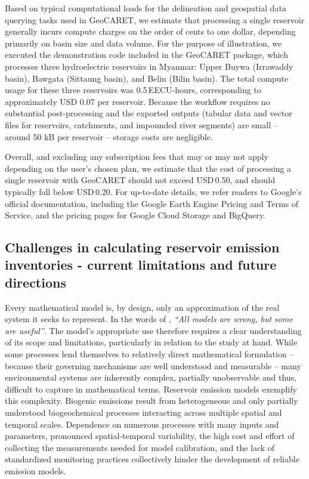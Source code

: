 \documentclass[10pt]{article}
\begin{document}
Based on typical computational loads for the delineation and geospatial data querying tasks used in GeoCARET, we estimate that processing a single reservoir generally incurs compute charges on the order of cents to one dollar, depending primarily on basin size and data volume.
For the purpose of illustration, we executed the demonstration code included in the GeoCARET package, which processes three hydroelectric reservoirs in Myanmar: Upper Buywa (Irrawaddy basin), Bawgata (Sittaung basin), and Belin (Bilin basin).
The total compute usage for these three reservoirs was 0.5\,EECU-hours, corresponding to approximately USD 0.07 per reservoir.
Because the workflow requires no substantial post-processing and the exported outputs (tabular data and vector files for reservoirs, catchments, and impounded river segments) are small -- around 50 kB per reservoir -- storage costs are negligible.

Overall, and excluding any subscription fees that may or may not apply depending on the user's chosen plan, we estimate that the cost of processing a single reservoir with GeoCARET should not exceed USD\,0.50, and should typically fall below USD\,0.20.
For up-to-date details, we refer readers to Google’s official documentation, including the Google Earth Engine Pricing and Terms of Service, and the pricing pages for Google Cloud Storage and BigQuery.

\subsection{Challenges in calculating reservoir emission inventories - current limitations and future directions}
\label{supp-subsec:challenges_modelling_emissions}

Every mathematical model is, by design, only an approximation of the real system it seeks to represent.
In the words of \citet{Box1976}, \emph{``All models are wrong, but some are useful''}.
The model's appropriate use therefore requires a clear understanding of its scope and limitations, particularly in relation to the study at hand.
While some processes lend themselves to relatively direct mathematical formulation -- because their governing mechanisms are well understood and measurable -- many environmental systems are inherently complex, partially unobservable and thus, difficult to capture in mathematical terms.
Reservoir emission models exemplify this complexity.
Biogenic emissions result from heterogeneous and only partially understood biogeochemical processes interacting across multiple spatial and temporal scales.
Dependence on numerous processes with many inputs and parameters, pronounced spatial-temporal variability, the high cost and effort of collecting the measurements needed for model calibration, and the lack of standardized monitoring practices collectively hinder the development of reliable emission models.
\end{document}
